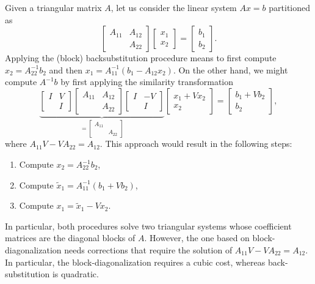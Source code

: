 \documentclass{siamart1116}
\begin{document}
Given a triangular matrix $A$, let us consider the linear system $Ax=b$ partitioned as
$$
\begin{bmatrix}
A_{11}&A_{12}\\
&A_{22}
\end{bmatrix}\begin{bmatrix}
x_1\\
x_2
\end{bmatrix}=\begin{bmatrix}
b_1\\ b_2
\end{bmatrix}.
$$
Applying the (block) backsubstitution procedure means to first compute $x_2=A_{22}^{-1}b_2$ and then $x_1= A_{11}^{-1}(b_1-A_{12}x_2)$. On the other hand, we might compute $A^{-1}b$ by first applying the similarity transformation
\[
  \underbrace{\begin{bmatrix}
    I & V \\
    & I 
  \end{bmatrix} \begin{bmatrix}
    A_{11} & A_{12} \\ 
    & A_{22} 
  \end{bmatrix} \begin{bmatrix}
    I & -V \\
    & I 
  \end{bmatrix}}_{= \left[ \begin{smallmatrix}
   A_{11} \\ & A_{22}
  \end{smallmatrix} \right]}
  \begin{bmatrix}
    x_1 + Vx_2 \\ 
    x_2 
  \end{bmatrix} = 
  \begin{bmatrix}
    b_1 + Vb_2 \\
    b_2
  \end{bmatrix},
\]
where $A_{11} V - VA_{22} = A_{12}$. This approach would result in the following steps:
\begin{enumerate}
    \item Compute $x_2=A_{22}^{-1}b_2$,
    \item Compute $\widetilde x_1=A_{11}^{-1}(b_1 + Vb_2)$,
    \item Compute $x_1= \widetilde x_1-  Vx_2$. 
\end{enumerate}
In particular, both procedures solve two triangular systems whose coefficient matrices are the diagonal blocks of $A$. However, the one based on block-diagonalization needs corrections that require the solution of $A_{11}V-VA_{22}=A_{12}$. In particular, 
the block-diagonalization requires a cubic cost, whereas 
back-substitution is quadratic. 
\end{document}
